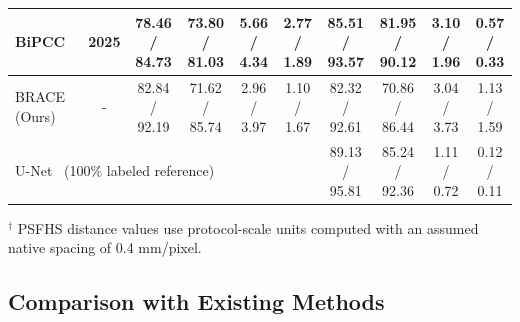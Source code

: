 \documentclass[a4paper,fleqn]{cas-dc}
\begin{document}
\begin{table}[!t]
{\begin{tabular}{l|c|cccc|cccc}
BiPCC~\cite{b51} & 2025 & 78.46 / 84.73 & 73.80 / 81.03 & 5.66 / 4.34 & 2.77 / 1.89 
& 85.51 / 93.57 & 81.95 / 90.12 & 3.10 / 1.96 & 0.57 / 0.33 \\
\midrule
BRACE (Ours) & - & 82.84 / 92.19 & 71.62 / 85.74 & 2.96 / 3.97 & 1.10 / 1.67 
& 82.32 / 92.61 & 70.86 / 86.44 & 3.04 / 3.73 & 1.13 / 1.59 \\
\midrule
\multicolumn{6}{l|}{U-Net~\cite{b16} (100\% labeled reference)} & 89.13 / 95.81 & 85.24 / 92.36 & 1.11 / 0.72 & 0.12 / 0.11 \\
\bottomrule
\end{tabular}
}
\vspace{1mm}
\noindent\footnotesize{$^\dagger$ PSFHS distance values use protocol-scale units computed with an assumed native spacing of 0.4 mm/pixel.}
\label{tab:psfhs_results}
\end{table}


\subsection{Comparison with Existing Methods}
\end{document}
